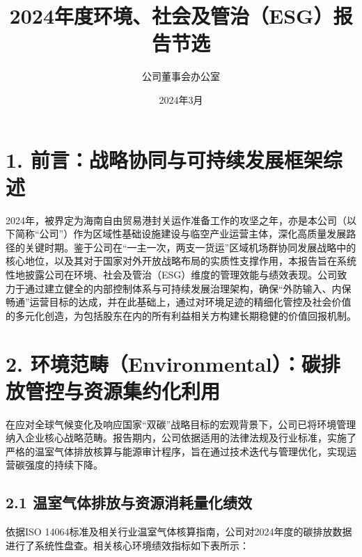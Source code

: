 \documentclass[a4paper,12pt]{article}
\title{\textbf{2024年度环境、社会及管治（ESG）报告节选}}
\author{公司董事会办公室}
\date{2024年3月}
\begin{document}
\maketitle


\section{1. 前言：战略协同与可持续发展框架综述}

2024年，被界定为海南自由贸易港封关运作准备工作的攻坚之年，亦是本公司（以下简称“公司”）作为区域性基础设施建设与临空产业运营主体，深化高质量发展路径的关键时期。鉴于公司在“一主一次，两支一货运”区域机场群协同发展战略中的核心地位，以及其对于国家对外开放战略布局的实质性支撑作用，本报告旨在系统性地披露公司在环境、社会及管治（ESG）维度的管理效能与绩效表现。公司致力于通过建立健全的内部控制体系与可持续发展治理架构，确保“外防输入、内保畅通”运营目标的达成，并在此基础上，通过对环境足迹的精细化管控及社会价值的多元化创造，为包括股东在内的所有利益相关方构建长期稳健的价值回报机制。

\section{2. 环境范畴（Environmental）：碳排放管控与资源集约化利用}

在应对全球气候变化及响应国家“双碳”战略目标的宏观背景下，公司已将环境管理纳入企业核心战略范畴。报告期内，公司依据适用的法律法规及行业标准，实施了严格的温室气体排放核算与能源审计程序，旨在通过技术迭代与管理优化，实现运营碳强度的持续下降。

\subsection{2.1 温室气体排放与资源消耗量化绩效}

依据ISO 14064标准及相关行业温室气体核算指南，公司对2024年度的碳排放数据进行了系统性盘查。相关核心环境绩效指标如下表所示：
\end{document}
